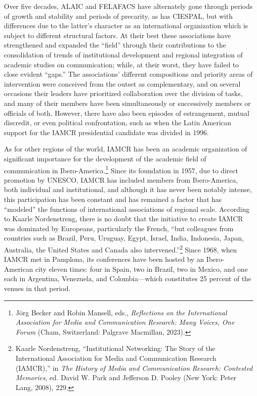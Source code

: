 \documentclass{tufte-handout}
\begin{document}
Over five decades, ALAIC and FELAFACS have alternately gone through
periods of growth and stability and periods of precarity, as has
CIESPAL, but with differences due to the latter's character as an
international organization which is subject to different structural
factors. At their best these associations have strengthened and expanded
the ``field'' through their contributions to the consolidation of trends
of institutional development and regional integration of academic
studies on communication; while, at their worst, they have failed to
close evident ``gaps.'' The associations' different compositions and
priority areas of intervention were conceived from the outset as
complementary, and on several occasions their leaders have prioritized
collaboration over the division of tasks, and many of their members have
been simultaneously or successively members or officials of both.
However, there have also been episodes of estrangement, mutual
discredit, or even political confrontation, such as when the Latin
American support for the IAMCR presidential candidate was divided in
1996.

As for other regions of the world, IAMCR has been an academic
organization of significant importance for the development of the
academic field of communication in Ibero-America.\footnote{Jörg Becker
  and Robin Mansell, eds., \emph{Reflections on the International
  Association for Media and Communication Research: Many Voices, One
  Forum} (Cham, Switzerland: Palgrave Macmillan, 2023).} Since its
foundation in 1957, due to direct promotion by UNESCO, IAMCR has
included members from Ibero-America, both individual and institutional,
and although it has never been notably intense, this participation has
been constant and has remained a factor that has ``modeled'' the
functions of international associations of regional scale. According to
Kaarle Nordenstreng, there is no doubt that the initiative to create
IAMCR was dominated by Europeans, particularly the French, ``but
colleagues from countries such as Brazil, Peru, Uruguay, Egypt, Israel,
India, Indonesia, Japan, Australia, the United States and Canada also
intervened.''\footnote{Kaarle Nordenstreng, ``Institutional Networking:
  The Story of the International Association for Media and Communication
  Research (IAMCR),'' in \emph{The History of Media and Communication
  Research: Contested Memories}, ed. David W. Park and Jefferson D.
  Pooley (New York: Peter Lang, 2008), 229.} Since 1968, when IAMCR met
in Pamplona, its conferences have been hosted by an Ibero-American city
eleven times: four in Spain, two in Brazil, two in Mexico, and one each
in Argentina, Venezuela, and Colombia---which constitutes 25 percent of
the venues in that period.
\end{document}
